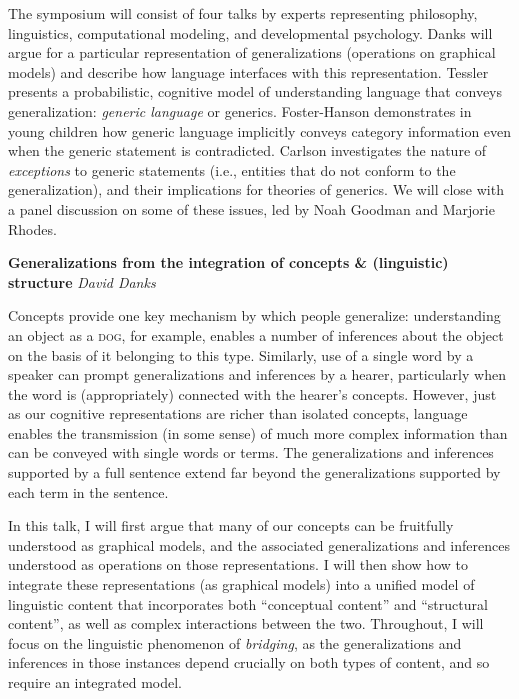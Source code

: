 \documentclass[10pt,letterpaper]{article}
\begin{document}
The symposium will consist of four talks by experts representing philosophy, linguistics, computational modeling, and developmental psychology.    
Danks will argue for a particular representation of generalizations (operations on graphical models) and describe how language interfaces with this representation.
 Tessler presents a probabilistic, cognitive model of understanding language that conveys generalization: \emph{generic language} or generics.
 Foster-Hanson demonstrates in young children how generic language implicitly conveys category information even when the generic statement is contradicted.
 Carlson investigates the nature of \emph{exceptions} to generic statements (i.e., entities that do not conform to the generalization), and their implications for theories of generics.
We will close with a panel discussion on some of these issues, led by Noah Goodman and Marjorie Rhodes.

\noindent\textbf{Generalizations from the integration of concepts \& (linguistic) structure} 
\noindent\emph{David Danks}

Concepts provide one key mechanism by which people generalize: understanding an object as a \textsc{dog}, for example, enables a number of inferences about the object on the basis of it belonging to this type. 
Similarly, use of a single word by a speaker can prompt generalizations and inferences by a hearer, particularly when the word is (appropriately) connected with the hearer's concepts. 
However, just as our cognitive representations are richer than isolated concepts, language enables the transmission (in some sense) of much more complex information than can be conveyed with single words or terms. 
The generalizations and inferences supported by a full sentence extend far beyond the generalizations supported by each term in the sentence. 

In this talk, I will first argue that many of our concepts can be fruitfully understood as graphical models, and the associated generalizations and inferences understood as operations on those representations. 
I will then show how to integrate these representations (as graphical models) into a unified model of linguistic content that incorporates both ``conceptual content'' and ``structural content'', as well as complex interactions between the two. 
Throughout, I will focus on the linguistic phenomenon of \emph{bridging}, as the generalizations and inferences in those instances depend crucially on both types of content, and so require an integrated model.
\end{document}
